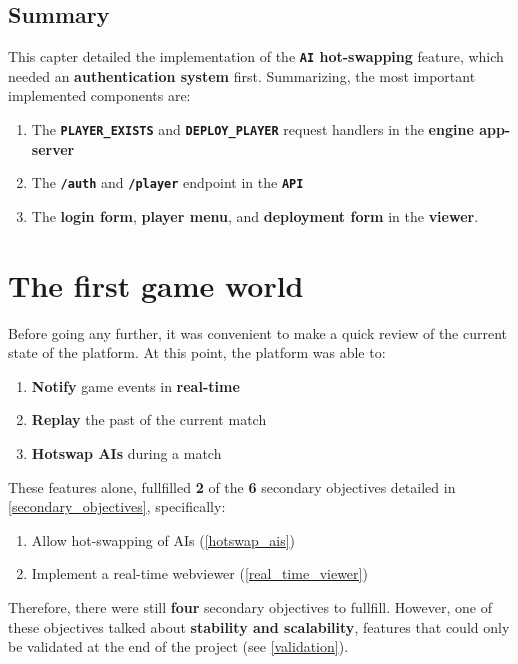 \documentclass[a4paper,11pt,titlepage,abstract,numbers=noenddot,automark,mnsy,intlimits,rgb,dvipsnames]{report}
\begin{document}
\section{Summary}
This capter detailed the implementation of the \textbf{\texttt{AI} hot-swapping} feature, which needed an
\textbf{authentication system} first. Summarizing, the most important implemented components are:
\begin{enumerate}
\item
The \textbf{\texttt{PLAYER\_EXISTS}} and \textbf{\texttt{DEPLOY\_PLAYER}} request handlers in the \textbf{engine app-server}
\item
The \textbf{\texttt{/auth}} and \textbf{\texttt{/player}} endpoint in the \textbf{\texttt{API}}
\item
The \textbf{login form}, \textbf{player menu}, and \textbf{deployment form} in the \textbf{viewer}.
\end{enumerate}
\chapter{The first game world}
\label{first_game_world}
Before going any further, it was convenient to make a quick review of the current state of the platform. At this point,
the platform was able to:
\begin{enumerate}
\item
\textbf{Notify} game events in \textbf{real-time}
\item
\textbf{Replay} the past of the current match
\item
\textbf{Hotswap AIs} during a match
\end{enumerate}
These features alone, fullfilled \textbf{2} of the \textbf{6} secondary objectives detailed in \autoref{secondary_objectives},
specifically:
\begin{enumerate}
\item
Allow hot-swapping of AIs (\autoref{hotswap_ais})
\item
Implement a real-time webviewer (\autoref{real_time_viewer})
\end{enumerate}
Therefore, there were still \textbf{four} secondary objectives to fullfill. However, one of these objectives talked about
\textbf{stability and scalability}, features that could only be validated at the end of the project (see \autoref{validation}).
\end{document}
